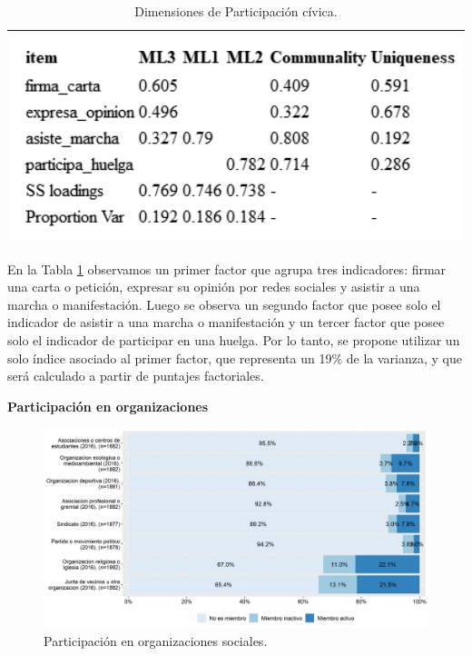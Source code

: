 \documentclass[
  12pt,
]{book}
\begin{document}
\begin{longtable}[]{@{}l@{}}
\caption{\label{tab:part-civica-fa}Dimensiones de Participación cívica.}\tabularnewline
\toprule
\endhead
\includegraphics[width=5.20833in,height=\textheight]{output/tables/part_civica_fa.png} \\
\bottomrule
\end{longtable}

En la Tabla \ref{tab:part-civica-fa} observamos un primer factor que agrupa tres indicadores: firmar una carta o petición, expresar su opinión por redes sociales y asistir a una marcha o manifestación. Luego se observa un segundo factor que posee solo el indicador de asistir a una marcha o manifestación y un tercer factor que posee solo el indicador de participar en una huelga. Por lo tanto, se propone utilizar un solo índice asociado al primer factor, que representa un 19\% de la varianza, y que será calculado a partir de puntajes factoriales.

\textbf{Participación en organizaciones}

\begin{figure}[H]

{\centering \includegraphics[width=1\linewidth,height=1\textheight]{output/graphs/participacion-organizaciones} 

}

\caption{Participación en organizaciones sociales.}\label{fig:participacion-organizaciones}
\end{figure}
\end{document}
